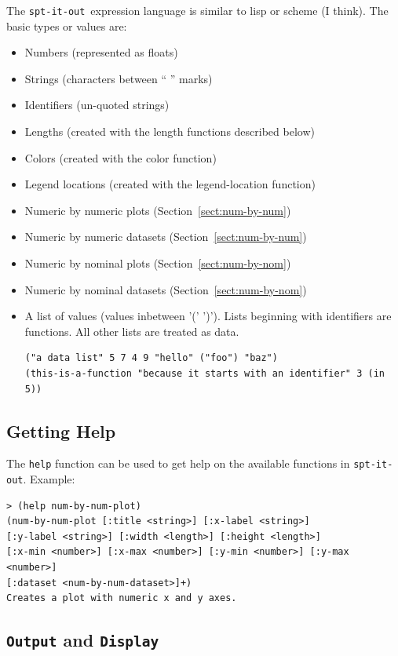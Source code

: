 \documentclass{article}
\newcommand{\sio}{{\tt spt-it-out}}
\begin{document}
The \sio\ expression language is similar to lisp or scheme (I think).
The basic types or values are:
\begin{itemize}
\item Numbers (represented as floats)
\item Strings (characters between `` '' marks)
\item Identifiers (un-quoted strings)
\item Lengths (created with the length functions described below)
\item Colors (created with the color function)
\item Legend locations (created with the legend-location function)
\item Numeric by numeric plots (Section~\ref{sect:num-by-num})
\item Numeric by numeric datasets (Section~\ref{sect:num-by-num})
\item Numeric by nominal plots (Section~\ref{sect:num-by-nom})
\item Numeric by nominal datasets (Section~\ref{sect:num-by-nom})
\item A list of values (values inbetween '(' ')').  Lists beginning
  with identifiers are functions.  All other lists are treated as
  data.
\begin{verbatim}
("a data list" 5 7 4 9 "hello" ("foo") "baz")
(this-is-a-function "because it starts with an identifier" 3 (in 5))
\end{verbatim}
\end{itemize}

\subsection{Getting Help}

The {\tt help} function can be used to get help on the available
functions in \sio.  Example:
\begin{verbatim}
> (help num-by-num-plot)
(num-by-num-plot [:title <string>] [:x-label <string>]
[:y-label <string>] [:width <length>] [:height <length>]
[:x-min <number>] [:x-max <number>] [:y-min <number>] [:y-max <number>]
[:dataset <num-by-num-dataset>]+)
Creates a plot with numeric x and y axes.
\end{verbatim}

\subsection{{\tt Output} and {\tt Display}}
\end{document}
